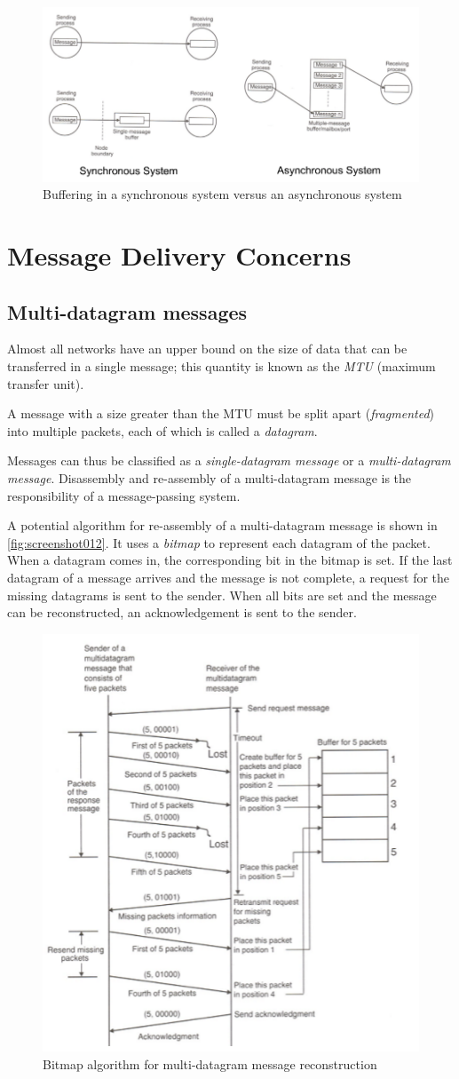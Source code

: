 \begin{figure}[h]
\centering
\includegraphics[width=0.9\linewidth]{screenshot011}
\caption{Buffering in a synchronous system versus an asynchronous system}
\label{fig:screenshot011}
\end{figure}

\section{Message Delivery Concerns}
\subsection{Multi-datagram messages}
Almost all networks have an upper bound on the size of data that can be transferred in a single message; this quantity is known as the \textit{MTU} (maximum transfer unit).

A message with a size greater than the MTU must be split apart (\textit{fragmented}) into multiple packets, each of which is called a \textit{datagram}.

Messages can thus be classified as a \textit{single-datagram message} or a \textit{multi-datagram message}. Disassembly and re-assembly of a multi-datagram message is the responsibility of a message-passing system.

A potential algorithm for re-assembly of a multi-datagram message is shown in \autoref{fig:screenshot012}. It uses a \textit{bitmap} to represent each datagram of the packet. When a datagram comes in, the corresponding bit in the bitmap is set. If the last datagram of a message arrives and the message is not complete, a request for the missing datagrams is sent to the sender. When all bits are set and the message can be reconstructed, an acknowledgement is sent to the sender.

\begin{figure}[h]
\centering
\includegraphics[width=0.4\linewidth]{screenshot012}
\caption{Bitmap algorithm for multi-datagram message reconstruction}
\label{fig:screenshot012}
\end{figure}

